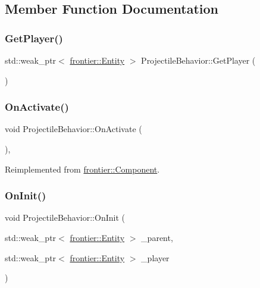 \subsection{Member Function Documentation}
\mbox{\label{class_projectile_behavior_ac0f47feec11bc48291c1d8721efe5bd8}} 
\subsubsection{\texorpdfstring{Get\+Player()}{GetPlayer()}}
{\footnotesize\ttfamily std\+::weak\+\_\+ptr$<$ \hyperlink{classfrontier_1_1_entity}{frontier\+::\+Entity} $>$ Projectile\+Behavior\+::\+Get\+Player (\begin{DoxyParamCaption}{ }\end{DoxyParamCaption})}

\mbox{\label{class_projectile_behavior_aa01c813e541f6069d7ca9c69848ca0a6}} 
\subsubsection{\texorpdfstring{On\+Activate()}{OnActivate()}}
{\footnotesize\ttfamily void Projectile\+Behavior\+::\+On\+Activate (\begin{DoxyParamCaption}{ }\end{DoxyParamCaption})\hspace{0.3cm}{\ttfamily [override]}, {\ttfamily [virtual]}}



Reimplemented from \hyperlink{classfrontier_1_1_component_a77fca7ba1960aafb9bc05905e300c79d}{frontier\+::\+Component}.

\mbox{\label{class_projectile_behavior_ab8caa701affecc1eaddb4bdc17152c23}} 
\subsubsection{\texorpdfstring{On\+Init()}{OnInit()}\hspace{0.1cm}{\footnotesize\ttfamily [1/2]}}
{\footnotesize\ttfamily void Projectile\+Behavior\+::\+On\+Init (\begin{DoxyParamCaption}\item[{std\+::weak\+\_\+ptr$<$ \hyperlink{classfrontier_1_1_entity}{frontier\+::\+Entity} $>$}]{\+\_\+parent,  }\item[{std\+::weak\+\_\+ptr$<$ \hyperlink{classfrontier_1_1_entity}{frontier\+::\+Entity} $>$}]{\+\_\+player }\end{DoxyParamCaption})}

